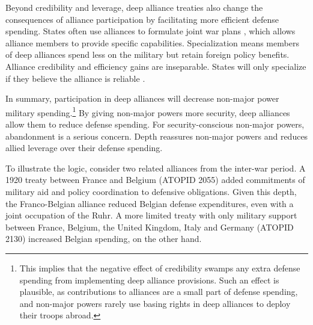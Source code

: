 \documentclass[12pt]{article}
\begin{document}
Beyond credibility and leverage, deep alliance treaties also change the consequences of alliance participation by facilitating more efficient defense spending. 
States often use alliances to formulate joint war plans \citep{Poast2019a}, which allows alliance members to provide specific capabilities. 
Specialization means members of deep alliances spend less on the military but retain foreign policy benefits.
Alliance credibility and efficiency gains are inseparable. 
States will only specialize if they believe the alliance is reliable \citep{Leeds2003a}.  


In summary, participation in deep alliances will decrease non-major power military spending.\footnote{This implies that the negative effect of credibility swamps any extra defense spending from implementing deep alliance provisions. Such an effect is plausible, as contributions to alliances are a small part of defense spending, and non-major powers rarely use basing rights in deep alliances to deploy their troops abroad.} 
By giving non-major powers more security, deep alliances allow them to reduce defense spending. 
For security-conscious non-major powers, abandonment is a serious concern. 
Depth reassures non-major powers and reduces allied leverage over their defense spending. 




To illustrate the logic, consider two related alliances from the inter-war period. 
A 1920 treaty between France and Belgium (ATOPID 2055) added commitments of military aid and policy coordination to defensive obligations. 
Given this depth, the Franco-Belgian alliance reduced Belgian defense expenditures, even with a joint occupation of the Ruhr. 
A more limited treaty with only military support between France, Belgium, the United Kingdom, Italy and Germany (ATOPID 2130) increased Belgian spending, on the other hand.   
 
\end{document}
